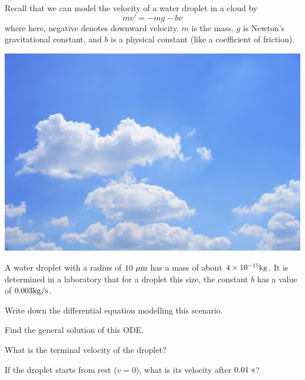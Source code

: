 

\begin{applicationActivities}



\begin{observation}
Recall that we can model the velocity of a water droplet in a cloud by
\[mv'=-mg-bv\]
where here, negative denotes downward velocity.  \(m\) is the mass, \(g\) is Newton's gravitational constant, and \(b\) is a physical constant (like a coefficient of friction).
\begin{center}
\includegraphics[scale=0.2]{media/cloud.jpg}
\end{center}
\end{observation}

\begin{activity}{25}
A water droplet with a radius of \(10\ {\rm \mu m}\) has a mass of about \(4 \times 10^{-15} {\rm kg}\).  It is determined in a laboratory that for a droplet this size, the constant \(b\) has a value of \(0.003 {\rm kg/s}\).
\begin{subactivity}
Write down the differential equation modelling this scenario.
\end{subactivity}
\begin{subactivity}
Find the general solution of this ODE.
\end{subactivity}
\begin{subactivity}
What is the terminal velocity of the droplet?
\end{subactivity}
\begin{subactivity}If the droplet starts from rest (\(v=0\)), what is its velocity after \(0.01\ {\rm s}\)?
\end{subactivity}
\end{activity}


\end{applicationActivities}
